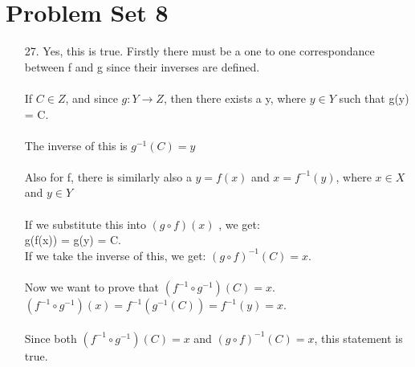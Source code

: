 \documentclass[12pt]{article}
\begin{document}
\section*{Problem Set 8}
\begin{itemize}
    \item [27.]
        Yes, this is true. Firstly there must be a one to one correspondance between f
        and g since their inverses are defined. \\
        \\
        If $C \in Z$, and since $g: Y \rightarrow Z$, then there exists a y, where
        $y \in Y$ such that g(y) = C. \\
        \\
        The inverse of this is $g^{-1}(C) = y$ \\
        \\
        Also for f, there is similarly also a $y = f(x)$ and $x = f^{-1}(y)$, where
            $x \in X$ and $y \in Y$ \\
        \\
        If we substitute this into $(g \circ f)(x)$ , we get: \\
        g(f(x)) = g(y) = C. \\
        If we take the inverse of this, we get: $(g \circ f)^{-1}(C) = x$. \\
        \\
        Now we want to prove that $(f^{-1} \circ g^{-1})(C) = x$. \\
        $(f^{-1} \circ g^{-1})(x) = f^{-1}(g^{-1}(C)) = f^{-1}(y) = x$. \\
        \\
        Since both $(f^{-1} \circ g^{-1})(C) = x$ and $(g \circ f)^{-1}(C) = x$, this
        statement is true.

\end{itemize}
\end{document}
